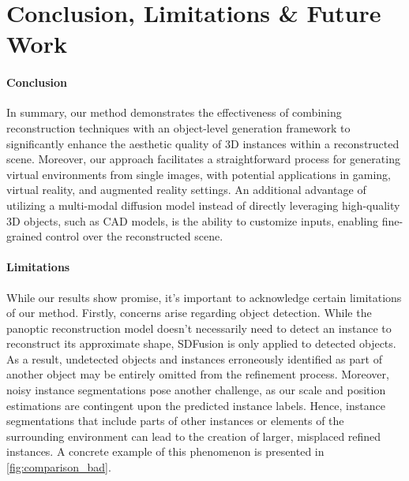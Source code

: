 \section{Conclusion, Limitations \& Future Work}
\label{sec:limitations}

\paragraph{Conclusion}
In summary, our method demonstrates the effectiveness of combining reconstruction techniques with an object-level generation framework to significantly enhance the aesthetic quality of 3D instances within a reconstructed scene.
Moreover, our approach facilitates a straightforward process for generating virtual environments from single images, with potential applications in gaming, virtual reality, and augmented reality settings.
An additional advantage of utilizing a multi-modal diffusion model instead of directly leveraging high-quality 3D objects, such as CAD models, is the ability to customize inputs, enabling fine-grained control over the reconstructed scene.

\paragraph{Limitations}
While our results show promise, it's important to acknowledge certain limitations of our method.
Firstly, concerns arise regarding object detection.
While the panoptic reconstruction model doesn't necessarily need to detect an instance to reconstruct its approximate shape, SDFusion is only applied to detected objects.
As a result, undetected objects and instances erroneously identified as part of another object may be entirely omitted from the refinement process.
Moreover, noisy instance segmentations pose another challenge, as our scale and position estimations are contingent upon the predicted instance labels.
Hence, instance segmentations that include parts of other instances or elements of the surrounding environment can lead to the creation of larger, misplaced refined instances.
A concrete example of this phenomenon is presented in \cref{fig:comparison_bad}.

